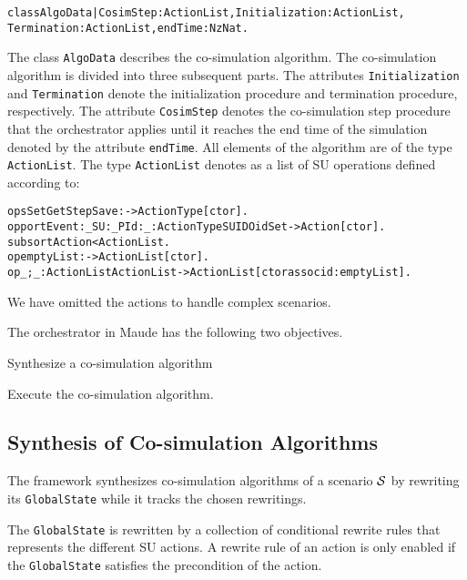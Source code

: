 \small
\begin{alltt}
class AlgoData | CosimStep : ActionList,   Initialization : ActionList, 
                 Termination : ActionList, endTime : NzNat .
\end{alltt}
\normalsize
The class \texttt{AlgoData} describes the co-simulation algorithm.
The co-simulation algorithm is divided into three subsequent parts.
The attributes \texttt{Initialization} and \texttt{Termination} denote the initialization procedure and termination procedure, respectively.
The attribute \texttt{CosimStep} denotes the co-simulation step procedure that the orchestrator applies until it reaches the end time of the simulation denoted by the attribute \texttt{endTime}.
All elements of the algorithm are of the type \texttt{ActionList}.
The type \texttt{ActionList} denotes as a list of SU operations defined according to:
\small
\begin{alltt}
ops Set Get Step Save : -> ActionType [ctor] . 
op portEvent:_SU:_PId:_ : ActionType SUID OidSet -> Action [ctor] .
subsort Action < ActionList .
op emptyList : -> ActionList [ctor] .
op _;_ : ActionList ActionList -> ActionList [ctor assoc id: emptyList] .
\end{alltt}
\normalfont
We have omitted the actions to handle complex scenarios.

The orchestrator in Maude has the following two objectives.
\begin{compactenum}
  \item Synthesize a co-simulation algorithm
  \item Execute the co-simulation algorithm.
\end{compactenum}

\subsection{Synthesis of Co-simulation Algorithms}
The framework synthesizes co-simulation algorithms of a scenario $\mathcal{S}$ by rewriting its \texttt{GlobalState} while it tracks the chosen rewritings.

The \texttt{GlobalState} is rewritten by a collection of conditional rewrite rules that represents the different SU actions.
A rewrite rule of an action is only enabled if the \texttt{GlobalState} satisfies the precondition of the action.

